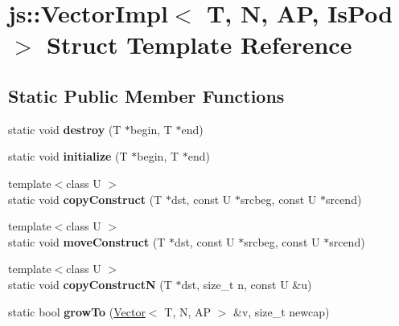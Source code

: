 \hypertarget{structjs_1_1_vector_impl}{\section{js\-:\-:Vector\-Impl$<$ T, N, A\-P, Is\-Pod $>$ Struct Template Reference}
\label{structjs_1_1_vector_impl}
}
\subsection*{Static Public Member Functions}
\begin{DoxyCompactItemize}
\item 
\hypertarget{structjs_1_1_vector_impl_a4ad64527221a61f397f314e98bd8b22c}{static void {\bfseries destroy} (T $\ast$begin, T $\ast$end)}\label{structjs_1_1_vector_impl_a4ad64527221a61f397f314e98bd8b22c}

\item 
\hypertarget{structjs_1_1_vector_impl_a3a23138b1af1cf2954138b2e25078300}{static void {\bfseries initialize} (T $\ast$begin, T $\ast$end)}\label{structjs_1_1_vector_impl_a3a23138b1af1cf2954138b2e25078300}

\item 
\hypertarget{structjs_1_1_vector_impl_adff79952e30c7740b46f75cc6a9b17ed}{{\footnotesize template$<$class U $>$ }\\static void {\bfseries copy\-Construct} (T $\ast$dst, const U $\ast$srcbeg, const U $\ast$srcend)}\label{structjs_1_1_vector_impl_adff79952e30c7740b46f75cc6a9b17ed}

\item 
\hypertarget{structjs_1_1_vector_impl_a0451c419d0c647f7f7f301ed013b83fb}{{\footnotesize template$<$class U $>$ }\\static void {\bfseries move\-Construct} (T $\ast$dst, const U $\ast$srcbeg, const U $\ast$srcend)}\label{structjs_1_1_vector_impl_a0451c419d0c647f7f7f301ed013b83fb}

\item 
\hypertarget{structjs_1_1_vector_impl_a3db161659cdc7fcbe328586493ec552a}{{\footnotesize template$<$class U $>$ }\\static void {\bfseries copy\-Construct\-N} (T $\ast$dst, size\-\_\-t n, const U \&u)}\label{structjs_1_1_vector_impl_a3db161659cdc7fcbe328586493ec552a}

\item 
\hypertarget{structjs_1_1_vector_impl_ae26fcd214742649f8f330b314b38f544}{static bool {\bfseries grow\-To} (\hyperlink{classjs_1_1_vector}{Vector}$<$ T, N, A\-P $>$ \&v, size\-\_\-t newcap)}\label{structjs_1_1_vector_impl_ae26fcd214742649f8f330b314b38f544}


\end{DoxyCompactItemize}
